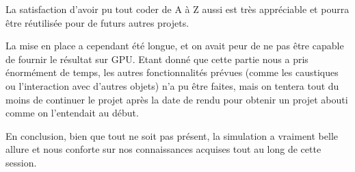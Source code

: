\documentclass[a4paper,11pt,leqno]{article}
\begin{document}
La satisfaction d'avoir pu tout coder de A à Z aussi est très appréciable et pourra être réutilisée pour de futurs autres projets.

La mise en place a cependant été longue, et on avait peur de ne pas être capable de fournir le résultat sur GPU. Etant donné que cette partie nous a pris énormément de temps, les autres fonctionnalités prévues (comme les caustiques ou l'interaction avec d'autres objets) n'a pu être faites, mais on tentera tout du moins de continuer le projet après la date de rendu pour obtenir un projet abouti comme on l'entendait au début.

En conclusion, bien que tout ne soit pas présent, la simulation a vraiment belle allure et nous conforte sur nos connaissances acquises tout au long de cette session.
\end{document}

